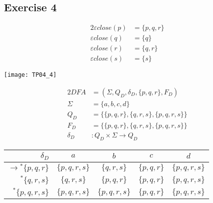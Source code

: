 {\subsection{Exercise 4}
\begin{alignat*}{2}
	\varepsilon close(p)&=\{p,q,r\}\\
	\varepsilon close(q)&=\{q\}\\
	\varepsilon close(r)&=\{q,r\}\\
	\varepsilon close(s)&=\{s\}
\end{alignat*}
\begin{center} \texttt{[image: TP04\_4]} \end{center}
\begin{alignat*}{2}
	DFA       &= (\Sigma, Q_D, \delta_D, \{p,q,r\}, F_D)\\
	\Sigma    &= \{a,b,c,d\}\\
	Q_D       &= \{\{p,q,r\},\{q,r,s\},\{p,q,r,s\}\}\\
	F_D       &= \{\{p,q,r\},\{q,r,s\},\{p,q,r,s\}\}\\
	\delta_D &\colon Q_D \times \Sigma \rightarrow Q_D
\end{alignat*}
\begin{center}
\begin{tabular}{ r | c c c c }
    $\delta_D                    $ & $a          $ & $b          $ & $c          $ & $d          $ \\ \hline
    $\rightarrow{^*} \{p,q,r  \}$ & $\{p,q,r,s\}$ & $\{  q,r,s\}$ & $\{p,q,r  \}$ & $\{p,q,r,s\}$ \\
    $           {^*} \{  q,r,s\}$ & $\{  q,r,s\}$ & $\{p,q,r  \}$ & $\{p,q,r  \}$ & $\{p,q,r,s\}$ \\
    $           {^*} \{p,q,r,s\}$ & $\{p,q,r,s\}$ & $\{p,q,r,s\}$ & $\{p,q,r  \}$ & $\{p,q,r,s\}$ \\
\end{tabular}
\end{center}
}
